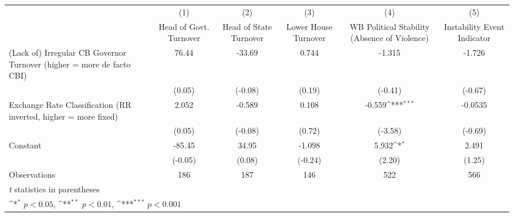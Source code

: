 {
\def\sym#1{\ifmmode^{#1}\else\(^{#1}\)\fi}
\begin{tabular}{l*{5}{c}}
\hline\hline
                &\multicolumn{1}{c}{(1)}&\multicolumn{1}{c}{(2)}&\multicolumn{1}{c}{(3)}&\multicolumn{1}{c}{(4)}&\multicolumn{1}{c}{(5)}\\
                &\multicolumn{1}{c}{Head of Govt. Turnover}&\multicolumn{1}{c}{Head of State Turnover}&\multicolumn{1}{c}{Lower House Turnover}&\multicolumn{1}{c}{WB Political Stability (Absence of Violence)}&\multicolumn{1}{c}{Instability Event Indicator}\\
\hline
(Lack of) Irregular CB Governor Turnover (higher = more de facto CBI)&    76.44         &   -33.69         &    0.744         &   -1.315         &   -1.726         \\
                &   (0.05)         &  (-0.08)         &   (0.19)         &  (-0.41)         &  (-0.67)         \\
[1em]
Exchange Rate Classification (RR inverted, higher = more fixed)&    2.052         &   -0.589         &    0.108         &   -0.559\sym{***}&  -0.0535         \\
                &   (0.05)         &  (-0.08)         &   (0.72)         &  (-3.58)         &  (-0.69)         \\
[1em]
Constant        &   -85.45         &    34.95         &   -1.098         &    5.932\sym{*}  &    2.491         \\
                &  (-0.05)         &   (0.08)         &  (-0.24)         &   (2.20)         &   (1.25)         \\
\hline
Observations    &      186         &      187         &      146         &      522         &      566         \\
\hline\hline
\multicolumn{6}{l}{\footnotesize \textit{t} statistics in parentheses}\\
\multicolumn{6}{l}{\footnotesize \sym{*} \(p<0.05\), \sym{**} \(p<0.01\), \sym{***} \(p<0.001\)}\\
\end{tabular}
}
